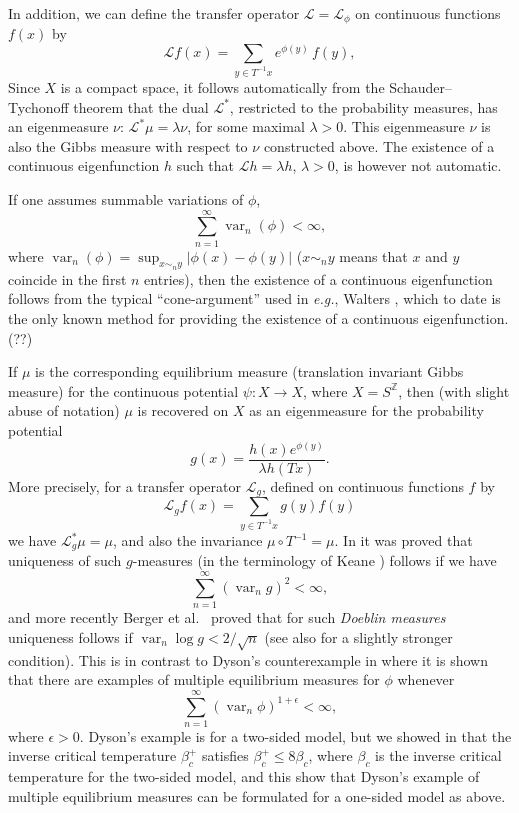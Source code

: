 \documentclass[11pt, a4paper]{amsart}
\theoremstyle{definition}
\theoremstyle{remark}
\providecommand{\mc}{\mathcal}
\providecommand{\opn}{\operatorname}
\providecommand{\var}{\opn{var}}
\def\X{X}
\begin{document}
In addition, we can define the transfer operator $\mc L=\mc L_\phi$ on
continuous functions $f(x)$ by
\begin{equation}\label{trans}
  {\mathcal L} f(x)= \sum_{y\in T^{-1}x} e^{\phi(y)}\, f(y),
\end{equation}
Since $\X$ is a compact space, it follows automatically from the
Schauder--Tychonoff theorem that the dual ${\mathcal L}^*$, restricted to the
probability measures, has an eigenmeasure $\nu$: ${\mathcal L}^* \mu=\lambda \nu$, for some
maximal $\lambda>0$. This eigenmeasure $\nu$ is also the Gibbs measure with respect to $\nu$ constructed above.
The existence of
a continuous eigenfunction $h$ such that ${\mathcal L}h=\lambda h$, $\lambda>0$, is however
not automatic.

If one assumes summable variations of $\phi$,
\begin{equation}\label{sum}
  \sum_{n=1}^\infty \var_n (\phi)<\infty,
\end{equation}
where $\var_n(\phi)=\sup_{x\sim_n y}|\phi(x)-\phi(y)|$ ($x\sim_n y$ means that $x$ and $y$
coincide in the first $n$ entries), then the existence of a continuous
eigenfunction follows from the typical ``cone-argument'' used in {\em e.g.},
Walters \cite{walters1}, which to date is the only known method for providing
the existence of a continuous eigenfunction. (??)

If $\mu$ is the corresponding equilibrium measure (translation invariant Gibbs
measure) for the continuous potential $\psi:X\to X$, where $X=S^{\mathbb Z}$, then
(with slight abuse of notation) $\mu$ is recovered on $\X$ as an eigenmeasure for
the probability potential
\begin{equation}\label{g}
  g(x)= \frac{h(x) e^{\phi(y)}}{\lambda h(Tx)}.
\end{equation} 
More precisely, for a transfer operator ${\mathcal L}_g$, defined on continuous functions $f$ by
\begin{equation} {\mathcal L}_g f(x)=\sum_{y\in T^{-1}x} g(y) f(y)
\end{equation}
we have ${\mathcal L}_g^*\mu=\mu$, and also the invariance $\mu\circ
T^{-1}=\mu$. In \cite{johob} it was proved that uniqueness of such $g$-measures (in the terminology of Keane \cite{keane}) follows if
we have
$$\sum_{n=1}^\infty (\var_n g)^2<\infty,$$
and more recently Berger et al.\  \cite{berger2} proved that for such {\em Doeblin measures} uniqueness follows if
$\var_n \log g <2/\sqrt{n}$ (see also \cite{johob3} for a slightly stronger condition). This is in contrast to Dyson's counterexample in \cite{dyson} where it is shown that there are examples of multiple equilibrium measures for $\phi$ whenever 
$$\sum_{n=1}^\infty (\var_n \phi)^{1+\epsilon}<\infty,$$
where $\epsilon>0$. Dyson's example is for a two-sided model, but we showed in \cite{johob4} that the inverse critical temperature $\beta_c^+$ satisfies $\beta_c^+\leq 8\beta_c$, where  $\beta_c$ is the inverse critical temperature for the two-sided model, and this show that Dyson's example of multiple equilibrium measures can be formulated for a one-sided model as above.
\end{document}
